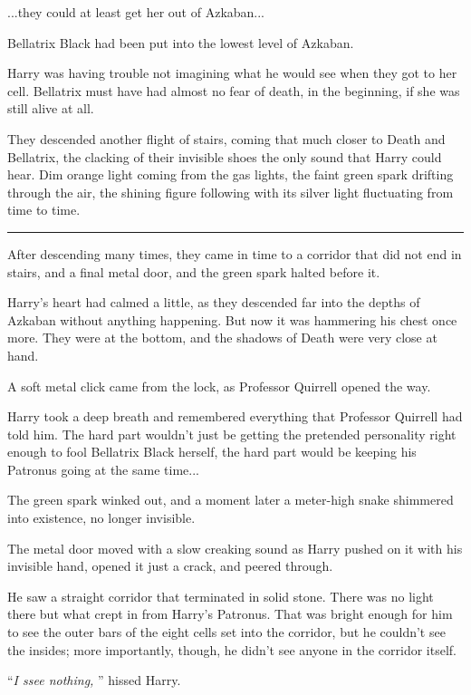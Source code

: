 ...they could at least get her out of Azkaban...

Bellatrix Black had been put into the lowest level of Azkaban.

Harry was having trouble not imagining what he would see when they got
to her cell. Bellatrix must have had almost no fear of death, in the
beginning, if she was still alive at all.

They descended another flight of stairs, coming that much closer to
Death and Bellatrix, the clacking of their invisible shoes the only
sound that Harry could hear. Dim orange light coming from the gas
lights, the faint green spark drifting through the air, the shining
figure following with its silver light fluctuating from time to time.

\begin{center}\rule{3in}{0.4pt}\end{center}

After descending many times, they came in time to a corridor that did
not end in stairs, and a final metal door, and the green spark halted
before it.

Harry's heart had calmed a little, as they descended far into the depths
of Azkaban without anything happening. But now it was hammering his
chest once more. They were at the bottom, and the shadows of Death were
very close at hand.

A soft metal click came from the lock, as Professor Quirrell opened the
way.

Harry took a deep breath and remembered everything that Professor
Quirrell had told him. The hard part wouldn't just be getting the
pretended personality right enough to fool Bellatrix Black herself, the
hard part would be keeping his Patronus going at the same time...

The green spark winked out, and a moment later a meter-high snake
shimmered into existence, no longer invisible.

The metal door moved with a slow creaking sound as Harry pushed on it
with his invisible hand, opened it just a crack, and peered through.

He saw a straight corridor that terminated in solid stone. There was no
light there but what crept in from Harry's Patronus. That was bright
enough for him to see the outer bars of the eight cells set into the
corridor, but he couldn't see the insides; more importantly, though, he
didn't see anyone in the corridor itself.

``\emph{I ssee nothing,} '' hissed Harry.

